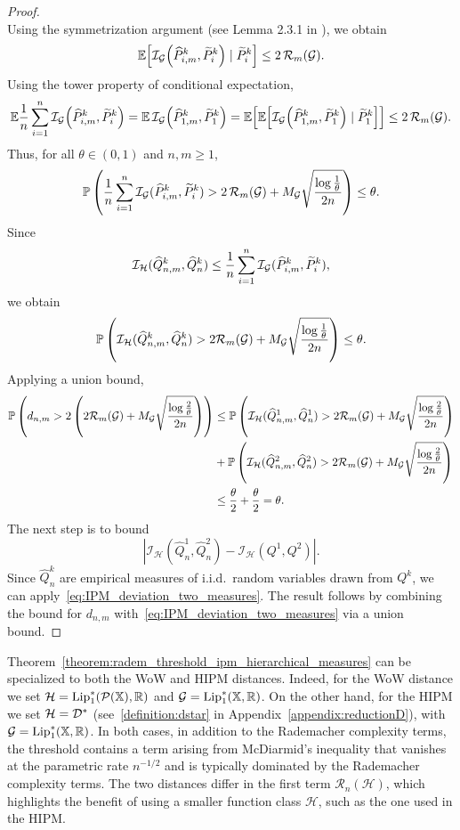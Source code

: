 \begin{proof}
\[\]
Using the symmetrization argument (see Lemma 2.3.1 in \cite{van1996weak}), we obtain
\[
\mathbb{E}\!\left[\mathcal{I}_{\mathcal{G}}\!\left(\widehat{P}^k_{i,m}, \widetilde{P}^k_i\right) \mid \widetilde{P}^k_i\right] \leq 2\,\mathcal{R}_m(\mathcal{G}).
\]
Using the tower property of conditional expectation,
\[
\mathbb{E} \frac{1}{n}\sum_{i = 1}^n \mathcal{I}_{\mathcal{G}}\!\left(\widehat{P}^k_{i,m}, \widetilde{P}^k_i\right)
= \mathbb{E}\,\mathcal{I}_{\mathcal{G}}\!\left(\widehat{P}^k_{1,m}, \widetilde{P}^k_1\right)
= \mathbb{E}\!\left[\mathbb{E}\!\left[\mathcal{I}_{\mathcal{G}}\!\left(\widehat{P}^k_{1,m}, \widetilde{P}^k_1\right) \mid \widetilde{P}^k_1\right]\right]
\leq 2\,\mathcal{R}_m(\mathcal{G}).
\]
Thus, for all $\theta \in (0,1)$ and $n, m \geq 1$,
\[
\mathbb{P}\left(\frac{1}{n}\sum_{i = 1}^n \mathcal{I}_{\mathcal{G}}(\widehat{P}^k_{i,m},\widetilde{P}^k_i) > 2\,\mathcal{R}_m(\mathcal{G}) + M_{\mathcal{G}} \sqrt{\frac{\log \frac{1}{\theta}}{2n}} \right) \leq \theta.
\]
Since
\[
\mathcal{I}_{\mathcal{H}}(\widehat{Q}^k_{n,m}, \widehat{Q}^k_n) \leq \frac{1}{n} \sum_{i = 1}^n \mathcal{I}_{\mathcal{G}}(\widehat{P}^k_{i,m},\widetilde{P}^k_i),
\]
we obtain
\[
\mathbb{P}\left( \mathcal{I}_{\mathcal{H}}(\widehat{Q}^k_{n,m}, \widehat{Q}^k_n)> 2 \mathcal{R}_m(\mathcal{G})+ M_{\mathcal{G}} \sqrt{\frac{\log \frac{1}{\theta}}{2n}} \right) \leq \theta.
\]
Applying a union bound,
\begin{align*}
\mathbb{P}\left( d_{n,m} > 2 \left(2 \mathcal{R}_m(\mathcal{G}) + M_{\mathcal{G}} \sqrt{\frac{\log \frac{2}{\theta}}{2n}} \right) \right) & \leq
\mathbb{P}\left( \mathcal{I}_{\mathcal{H}}(\widehat{Q}^1_{n,m}, \widehat{Q}^1_n) > 2 \mathcal{R}_m(\mathcal{G}) + M_{\mathcal{G}} \sqrt{\frac{\log \frac{2}{\theta}}{2n}} \right) \\
& + \mathbb{P} \left( \mathcal{I}_{\mathcal{H}}(\widehat{Q}^2_{n,m}, \widehat{Q}^2_n) > 2 \mathcal{R}_m(\mathcal{G}) + M_{\mathcal{G}} \sqrt{\frac{\log \frac{2}{\theta}}{2n}} \right) \\
&\leq \frac{\theta}{2} + \frac{\theta}{2} = \theta.
\end{align*}
The next step is to bound
\[
\left|\mathcal{I}_\mathcal{H}(\widehat{Q}^1_n, \widehat{Q}^2_n) - \mathcal{I}_\mathcal{H}(Q^1, Q^2) \right|.
\]
Since $\widehat{Q}^k_n$ are empirical measures of i.i.d.\ random variables drawn from $Q^k$, we can apply~\eqref{eq:IPM_deviation_two_measures}. The result follows by combining the bound for $d_{n,m}$ with~\eqref{eq:IPM_deviation_two_measures} via a union bound.
\end{proof}


Theorem~\ref{theorem:radem_threshold_ipm_hierarchical_measures} can be specialized to both the WoW and HIPM distances. Indeed, for the WoW distance we set $\mathcal{H} = \mathrm{Lip}_1^*\!\left(\mathcal{P}(\mathbb{X}), \mathbb{R}\right)$ and $\mathcal{G} = \mathrm{Lip}_1^*(\mathbb{X},\mathbb{R})$. On the other hand, for the HIPM we set $\mathcal{H} = \mathcal{D}^*$ (see~\eqref{definition:dstar} in Appendix~\ref{appendix:reductionD}), with $\mathcal{G} = \mathrm{Lip}_1^*(\mathbb{X},\mathbb{R})$. In both cases, in addition to the Rademacher complexity terms, the threshold contains a term arising from McDiarmid's inequality that vanishes at the parametric rate $n^{-1/2}$ and is typically dominated by the Rademacher complexity terms. The two distances differ in the first term $\mathcal{R}_n(\mathcal{H})$, which highlights the benefit of using a smaller function class $\mathcal{H}$, such as the one used in the HIPM. 

